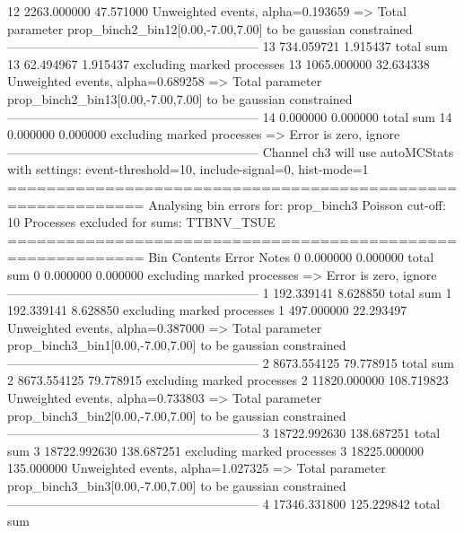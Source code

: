 12         2263.000000     47.571000       Unweighted events, alpha=0.193659
  => Total parameter prop_binch2_bin12[0.00,-7.00,7.00] to be gaussian constrained
------------------------------------------------------------
13         734.059721      1.915437        total sum                     
13         62.494967       1.915437        excluding marked processes    
13         1065.000000     32.634338       Unweighted events, alpha=0.689258
  => Total parameter prop_binch2_bin13[0.00,-7.00,7.00] to be gaussian constrained
------------------------------------------------------------
14         0.000000        0.000000        total sum                     
14         0.000000        0.000000        excluding marked processes    
  => Error is zero, ignore      
------------------------------------------------------------
Channel ch3 will use autoMCStats with settings: event-threshold=10, include-signal=0, hist-mode=1
============================================================
Analysing bin errors for: prop_binch3
Poisson cut-off: 10
Processes excluded for sums: TTBNV_TSUE
============================================================
Bin        Contents        Error           Notes                         
0          0.000000        0.000000        total sum                     
0          0.000000        0.000000        excluding marked processes    
  => Error is zero, ignore      
------------------------------------------------------------
1          192.339141      8.628850        total sum                     
1          192.339141      8.628850        excluding marked processes    
1          497.000000      22.293497       Unweighted events, alpha=0.387000
  => Total parameter prop_binch3_bin1[0.00,-7.00,7.00] to be gaussian constrained
------------------------------------------------------------
2          8673.554125     79.778915       total sum                     
2          8673.554125     79.778915       excluding marked processes    
2          11820.000000    108.719823      Unweighted events, alpha=0.733803
  => Total parameter prop_binch3_bin2[0.00,-7.00,7.00] to be gaussian constrained
------------------------------------------------------------
3          18722.992630    138.687251      total sum                     
3          18722.992630    138.687251      excluding marked processes    
3          18225.000000    135.000000      Unweighted events, alpha=1.027325
  => Total parameter prop_binch3_bin3[0.00,-7.00,7.00] to be gaussian constrained
------------------------------------------------------------
4          17346.331800    125.229842      total sum                     
